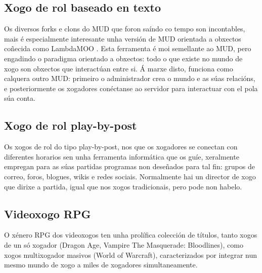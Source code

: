 \subsection{Xogo de rol baseado en texto}
Os diversos forks e clons do MUD que foron saíndo co tempo son incontables, mais
é especialmente interesante unha versión de MUD orientada a obxectos coñecida
como LambdaMOO \cite{lambdamoo}. Esta ferramenta é moi semellante ao MUD, pero
engadindo o paradigma orientado a obxectos: todo o que existe no mundo de xogo
son obxectos que interactúan entre si. Á marxe disto, funciona como calquera
outro MUD: primeiro o administrador crea o mundo e as súas relacións, e
posteriormente os xogadores conéctanse ao servidor para interactuar con el pola
súa conta.

\subsection{Xogo de rol play-by-post}
Os xogos de rol do tipo play-by-post, nos que os xogadores se conectan con
diferentes horarios sen unha ferramenta informática que os guíe, xeralmente
empregan para as súas partidas programas non deseñados para tal fin:
grupos de correo, foros, blogues, wikis e redes sociais. Normalmente hai un
director de xogo que dirixe a partida, igual que nos xogos tradicionais, pero
pode non habelo.

\subsection{Videoxogo RPG}
O xénero RPG dos videoxogos ten unha prolífica colección de títulos, tanto xogos
de un só xogador (Dragon Age, Vampire The Masquerade: Bloodlines), como xogos
multixogador masivos (World of Warcraft), caracterizados por integrar nun mesmo
mundo de xogo a miles de xogadores simultaneamente.

